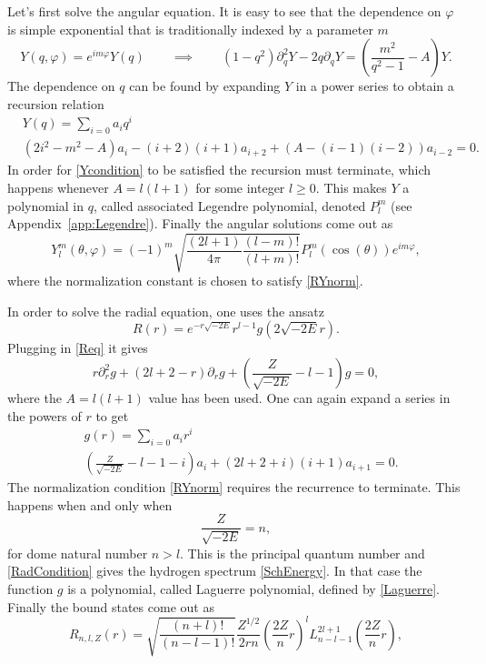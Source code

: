 Let's first solve the angular equation. It is easy to see that the dependence on $\varphi$ is simple exponential that is traditionally indexed by a parameter $m$
\begin{equation}
    Y(q,\varphi) = e^{i m \varphi}Y(q) \qquad \implies \qquad (1-q^2) \partial^2_q Y-2 q\partial_q Y= \left(\frac{m^2}{q^2-1}-A \right) Y.
\end{equation}
The dependence on $q$ can be found by expanding $Y$ in a power series to obtain a recursion relation
\begin{align}
    &Y(q)=\sum_{i=0}a_iq^i \\
    &(2i^2-m^2-A)a_i-(i+2)(i+1)a_{i+2} +(A-(i-1)(i-2))a_{i-2}=0.
\end{align}
In order for \eqref{Ycondition} to be satisfied the recursion must terminate, which happens whenever $A=l(l+1)$ for some integer $l\geq0$. This makes $Y$ a polynomial in $q$, called associated Legendre polynomial, denoted $P^m_l$ (see Appendix~\ref{app:Legendre}). Finally the angular solutions come out as
\begin{equation}
    Y^m_l(\theta,\varphi) = (-1)^m\sqrt{\frac{(2l+1)}{4\pi}\frac{(l-m)!}{(l+m)!}}P^m_l(\cos(\theta))e^{i m \varphi},
\end{equation}
where the normalization constant is chosen to satisfy \eqref{RYnorm}.

In order to solve the radial equation, one uses the ansatz
\begin{equation}
R(r) = e^{-r\sqrt{-2E}}r^{l-1}g(2\sqrt{-2E}r).
\end{equation}
Plugging in \eqref{Req} it gives
\begin{equation}
    r\partial_{r}^2g+(2l+2-r)\partial_rg+\left(\frac{Z}{\sqrt{-2E}}-l-1\right)g=0,
\end{equation}
where the $A=l(l+1)$ value has been used. One can again expand a series in the powers of $r$ to get
\begin{align}
    &g(r)=\sum_{i=0}a_ir^i \\
    &\left(\frac{Z}{\sqrt{-2E}}-l-1-i\right)a_i+(2l+2+i)(i+1)a_{i+1}=0.
\end{align}
The normalization condition \eqref{RYnorm} requires the recurrence to terminate. This happens when and only when
\begin{equation} \label{RadCondition}
    \frac{Z}{\sqrt{-2E}} = n,
\end{equation} for dome natural number $n>l$. This is the principal quantum number and \eqref{RadCondition} gives the hydrogen spectrum \eqref{SchEnergy}. In that case the function $g$ is a polynomial, called Laguerre polynomial, defined by \eqref{Laguerre}. Finally the bound states come out as
\begin{equation} %
	R_{n,l,Z}(r)=\sqrt{\frac{(n+l)!}{(n-l-1)!}}\frac{Z^{1/2}}{2 r n}\left(\frac{2 Z}{n} r\right)^l L_{n-l-1}^{2l+1}\left(\frac{2Z}{n}r \right),
\end{equation}

